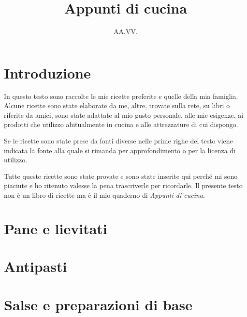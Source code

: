 \documentclass{report}
\makeatletter
\newif\if@mainmatter \@mainmattertrue
\newcommand\frontmatter{%
    \cleardoublepage
  \@mainmatterfalse
  \pagenumbering{roman}}
\newcommand\mainmatter{%
    \cleardoublepage
  \@mainmattertrue
  \pagenumbering{arabic}}
\makeatother
\begin{document}
\title{Appunti di cucina}
\author{AA.VV.}

\maketitle
\frontmatter
\tableofcontents

\mainmatter
\chapter*{Introduzione}

In questo testo sono raccolte le mie ricette preferite e quelle della mia famiglia. Alcune ricette sono state elaborate da me, altre, trovate sulla rete, su libri o riferite da amici, sono state adattate al mio gusto personale, alle mie esigenze, ai prodotti che utilizzo abitualmente in cucina e alle attrezzature di cui dispongo.

Se le ricette sono state prese da fonti diverse nelle prime righe del testo viene indicata la fonte alla quale si rimanda per approfondimento o per la licenza di utilizzo.

Tutte queste ricette sono state provate e sono state inserite qui perché mi sono piaciute e ho ritenuto valesse la pena trascriverle per ricordarle. Il presente testo non è un libro di ricette ma è il mio quaderno di \emph{Appunti di cucina}.



\newpage
\chapter{Pane e lievitati}






\newpage
\chapter{Antipasti}



\newpage
\chapter{Salse e preparazioni di base}








\end{document}

